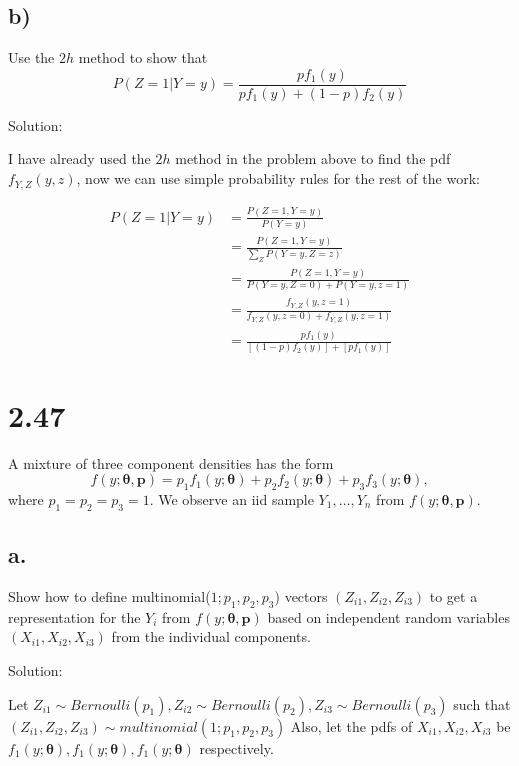 \documentclass[
  letterpaper,
  DIV=11,
  numbers=noendperiod]{scrreprt}
\begin{document}
\hypertarget{b-2}{%
\subsection{b)}\label{b-2}}

Use the \(2h\) method to show that
\[P(Z=1|Y=y) = \frac{pf_1(y)}{pf_1(y) + (1-p)f_2(y)}\]

Solution:

I have already used the \(2h\) method in the problem above to find the
pdf \(f_{Y,Z}(y,z)\), now we can use simple probability rules for the
rest of the work:

\[\begin{aligned}
P(Z=1|Y=y) &= \frac{P(Z=1,Y=y)}{P(Y=y)}\\
&= \frac{P(Z=1,Y=y)}{\sum_{Z}P(Y=y,Z=z)}\\
&= \frac{P(Z=1,Y=y)}{P(Y=y,Z=0) + P(Y=y,z=1)}\\
&= \frac{f_{Y,Z} (y,z=1)}{f_{Y,Z} (y,z=0) + f_{Y,Z} (y,z=1)} \\
&= \frac{pf_1(y)}{[(1-p)f_2(y)] + [pf_1(y)]}
\end{aligned}
\]

\newpage

\hypertarget{section-17}{%
\section{2.47}\label{section-17}}

A mixture of three component densities has the form
\[f(y;\boldsymbol \theta, \mathbf p) = p_1f_1(y;\boldsymbol \theta) + p_2f_2(y;\boldsymbol \theta) + p_3f_3(y;\boldsymbol \theta),\]
where \(p_1= p_2 = p_3 = 1\). We observe an iid sample
\(Y_1,\dots, Y_n\) from \(f(y;\boldsymbol \theta, \mathbf p )\).

\hypertarget{a.-4}{%
\subsection{a.}\label{a.-4}}

Show how to define multinomial(\(1;p_1,p_2,p_3\)) vectors
\((Z_{i1},Z_{i2},Z_{i3})\) to get a representation for the \(Y_i\) from
\(f(y;\boldsymbol \theta, \mathbf p )\) based on independent random
variables \((X_{i1},X_{i2},X_{i3})\) from the individual components.

Solution:

Let
\(Z_{i1} \sim Bernoulli(p_1),Z_{i2} \sim Bernoulli(p_2),Z_{i3} \sim Bernoulli(p_3)\)
such that \((Z_{i1},Z_{i2},Z_{i3}) \sim multinomial(1;p_1,p_2,p_3)\)
Also, let the pdfs of \(X_{i1},X_{i2},X_{i3}\) be
\(f_1(y;\boldsymbol \theta), f_1(y;\boldsymbol \theta), f_1(y;\boldsymbol \theta)\)
respectively.
\end{document}
